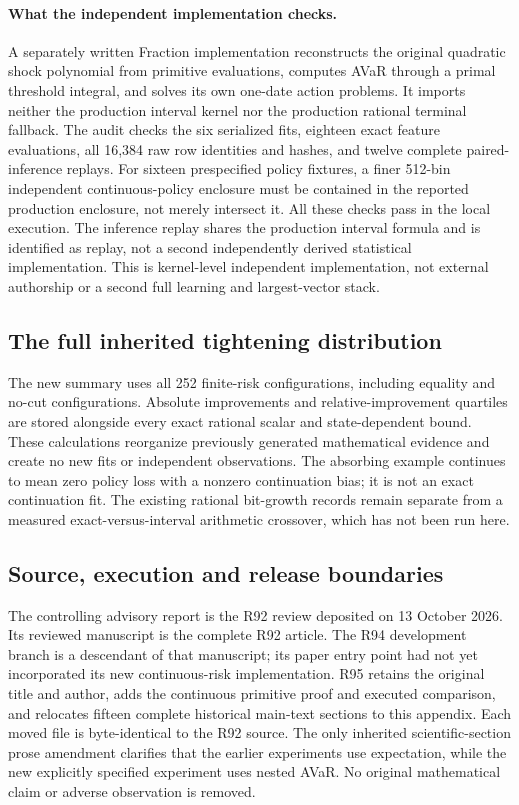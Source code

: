 \paragraph{What the independent implementation checks.}
A separately written Fraction implementation reconstructs the original quadratic shock polynomial from primitive evaluations, computes AVaR through a primal threshold integral, and solves its own one-date action problems. It imports neither the production interval kernel nor the production rational terminal fallback. The audit checks the six serialized fits, eighteen exact feature evaluations, all 16,384 raw row identities and hashes, and twelve complete paired-inference replays. For sixteen prespecified policy fixtures, a finer 512-bin independent continuous-policy enclosure must be contained in the reported production enclosure, not merely intersect it. All these checks pass in the local execution. The inference replay shares the production interval formula and is identified as replay, not a second independently derived statistical implementation. This is kernel-level independent implementation, not external authorship or a second full learning and largest-vector stack.

\subsection{The full inherited tightening distribution}

The new summary uses all 252 finite-risk configurations, including equality and no-cut configurations. Absolute improvements and relative-improvement quartiles are stored alongside every exact rational scalar and state-dependent bound. These calculations reorganize previously generated mathematical evidence and create no new fits or independent observations. The absorbing example continues to mean zero policy loss with a nonzero continuation bias; it is not an exact continuation fit. The existing rational bit-growth records remain separate from a measured exact-versus-interval arithmetic crossover, which has not been run here.

\subsection{Source, execution and release boundaries}
The controlling advisory report is the R92 review deposited on 13 October 2026. Its reviewed manuscript is the complete R92 article. The R94 development branch is a descendant of that manuscript; its paper entry point had not yet incorporated its new continuous-risk implementation. R95 retains the original title and author, adds the continuous primitive proof and executed comparison, and relocates fifteen complete historical main-text sections to this appendix. Each moved file is byte-identical to the R92 source. The only inherited scientific-section prose amendment clarifies that the earlier experiments use expectation, while the new explicitly specified experiment uses nested AVaR. No original mathematical claim or adverse observation is removed.


